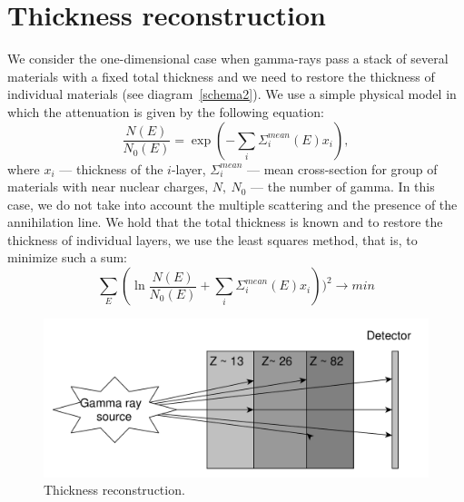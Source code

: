 \documentclass[a4paper]{panl}
\begin{document}
\section*{Thickness reconstruction}

We consider the one-dimensional case when gamma-rays pass a stack of several materials with a fixed total thickness and we need to restore the thickness of individual materials (see diagram~\ref{schema2}). We use a simple physical model in which the attenuation is given by the following equation:
\begin{equation}
\label{eq:gamma}
\frac{N(E)}{N_0(E)} = \exp(-\sum_i \Sigma^{mean}_i(E)x_i),
\end{equation}
where $x_i$ --- thickness of the $i$-layer, $\Sigma^{mean}_i$ --- mean cross-section for group of materials with near nuclear charges, $N,~N_0$ --- the number of gamma. In this case, we do not take into account the multiple scattering and the presence of the annihilation line. We hold that the total thickness is known and to restore the thickness of individual layers, we use the least squares method, that is, to minimize such a sum:
\begin{equation}
\sum_E(\ln \frac{N(E)}{N_0(E)} + \sum_i \Sigma^{mean}_i(E)x_i))^2 \to min
\end{equation}
\begin{figure} 
    \includegraphics[width=\linewidth]{yed_schema_2.pdf}
    \vspace{-3mm}
    \caption{Thickness reconstruction.}
    \vspace{-5mm}
\end{figure}
\end{document}
